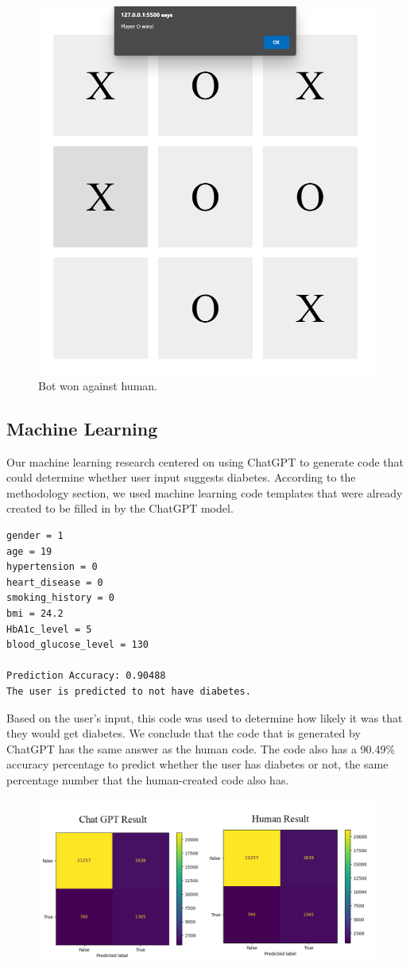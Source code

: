 \documentclass[conference]{IEEEtran}
\begin{document}
\vspace{-10pt}

\begin{figure}[H]
\centerline{\includegraphics[width=0.3\linewidth]{Simple Application/won.png}}
\caption{Bot won against human.}
\label{simple app won}
\end{figure}

\subsection{Machine Learning}
Our machine learning research centered on using ChatGPT to generate code that could determine whether user input suggests diabetes. According to the methodology section, we used machine learning code templates that were already created to be filled in by the ChatGPT model.



\begin{lstlisting}[caption={Given Input \& ChatGPT Diabetes Result}, basicstyle=\scriptsize\ttfamily]
gender = 1
age = 19
hypertension = 0
heart_disease = 0
smoking_history = 0
bmi = 24.2
HbA1c_level = 5
blood_glucose_level = 130

Prediction Accuracy: 0.90488
The user is predicted to not have diabetes.
\end{lstlisting}

Based on the user's input, this code was used to determine how likely it was that they would get diabetes. We conclude that the code that is generated by ChatGPT has the same answer as the human code. The code also has a 90.49\% accuracy percentage to predict whether the user has diabetes or not, the same percentage number that the human-created code also has.

\begin{figure}[htbp]
\centerline{\includegraphics[width=1.05\linewidth]{Machine Learning/Diabetes_H.png}}
\caption{}
\label{simple app won}
\end{figure}
\end{document}
